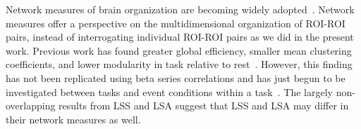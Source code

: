 \documentclass[10pt,letterpaper]{article}
\begin{document}
Network measures of brain organization are becoming widely adopted~\cite{Rubinov2010}.
Network measures offer a perspective on the multidimensional organization of ROI-ROI pairs, instead of
interrogating individual ROI-ROI pairs as we did in the present work.
Previous work has found greater global efficiency, smaller mean clustering coefficients, and lower modularity in
task relative to rest~\cite{Di2013}.
However, this finding has not been replicated using beta series correlations and has just begun
to be investigated between tasks and event conditions within a task~\cite{Di2019a}.
The largely non-overlapping results from LSS and LSA suggest that LSS and LSA may differ
in their network measures as well.

\end{document}
